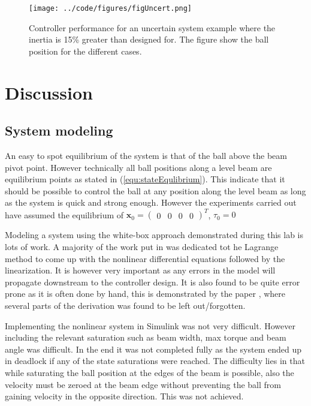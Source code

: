 \documentclass[a4paper, titlepage]{article}
\begin{document}
\begin{figure}[H]
\center
\texttt{[image: ../code/figures/figUncert.png]}
\caption{Controller performance for an uncertain system example where the inertia is 15\% greater than designed for. The figure show the ball position for the different cases.}
\label{fig:uncert}
\end{figure}


\section{Discussion}
\subsection{System modeling}
An easy to spot equilibrium of the system is that of the ball above the beam pivot point.
However technically all ball positions along a level beam are equilibrium points as stated in (\ref{equ:stateEqulibrium}).
This indicate that it should be possible to control the ball at any position along the level beam as long as the system is quick and strong enough.
However the experiments carried out have assumed the equilibrium of $\textbf{x}_0 = \begin{pmatrix} 0 & 0 & 0 & 0 \end{pmatrix}^T$, $\tau_0 = 0$


Modeling a system using the white-box approach demonstrated during this lab is lots of work.
A majority of the work put in was dedicated tot he Lagrange method to come up with the nonlinear differential equations followed by the linearization.
It is however very important as any errors in the model will propagate downstream to the controller design.
It is also found to be quite error prone as it is often done by hand, this is demonstrated by the paper \citep{BolvarVincenty2014ModellingTB}, where several parts of the derivation was found to be left out/forgotten.

Implementing the nonlinear system in Simulink was not very difficult.
However including the relevant saturation such as beam width, max torque and beam angle was difficult.
In the end it was not completed fully as the system ended up in deadlock if any of the state saturations were reached.
The difficulty lies in that while saturating the ball position at the edges of the beam is possible, also the velocity must be zeroed at the beam edge without preventing the ball from gaining velocity in the opposite direction.
This was not achieved.
\end{document}
